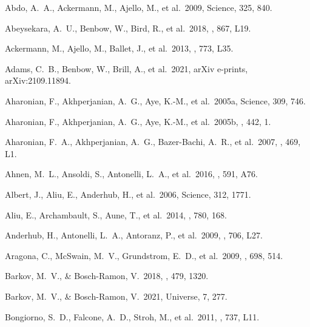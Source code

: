 \documentclass{aa}
\begin{document}
\begin{thebibliography}{}




 Abdo, A.~A., Ackermann, M., Ajello, M., et al.\ 2009, Science, 325, 840.

 Abeysekara, A.~U., Benbow, W., Bird, R., et al.\ 2018, \apjl, 867, L19.

 Ackermann, M., Ajello, M., Ballet, J., et al.\ 2013, \apjl, 773, L35.

 Adams, C.~B., Benbow, W., Brill, A., et al.\ 2021, arXiv e-prints, arXiv:2109.11894.

 Aharonian, F., Akhperjanian, A.~G., Aye, K.-M., et al.\ 2005a, Science, 309, 746.

 Aharonian, F., Akhperjanian, A.~G., Aye, K.-M., et al.\ 2005b, \aap, 442, 1.

 Aharonian, F.~A., Akhperjanian, A.~G., Bazer-Bachi, A.~R., et al.\ 2007, \aap, 469, L1.

 Ahnen, M.~L., Ansoldi, S., Antonelli, L.~A., et al.\ 2016, \aap, 591, A76.

 Albert, J., Aliu, E., Anderhub, H., et al.\ 2006, Science, 312, 1771.

 Aliu, E., Archambault, S., Aune, T., et al.\ 2014, \apj, 780, 168.

 Anderhub, H., Antonelli, L.~A., Antoranz, P., et al.\ 2009, \apjl, 706, L27.

 Aragona, C., McSwain, M.~V., Grundstrom, E.~D., et al.\ 2009, \apj, 698, 514.

 Barkov, M.~V., \& Bosch-Ramon, V.\ 2018, \mnras, 479, 1320.

 Barkov, M.~V., \& Bosch-Ramon, V.\ 2021, Universe, 7, 277.

 Bongiorno, S.~D., Falcone, A.~D., Stroh, M., et al.\ 2011, \apjl, 737, L11.


\end{thebibliography}
\end{document}
